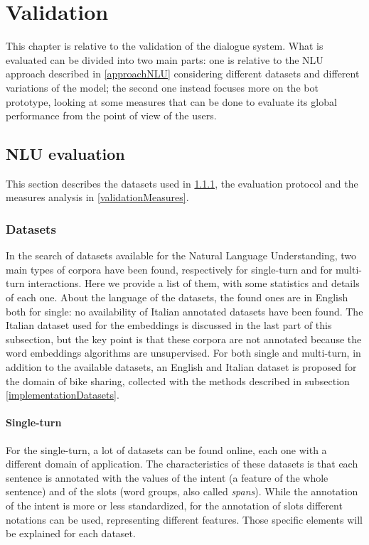 
\chapter{Validation}
\label{validation}

This chapter is relative to the validation of the dialogue system. What is evaluated can be divided into two main parts: one is relative to the NLU approach described in \ref{approachNLU} considering different datasets and different variations of the model; the second one instead focuses more on the bot prototype, looking at some measures that can be done to evaluate its global performance from the point of view of the users.

\section{NLU evaluation}
\label{validationNLU}

This section  describes the datasets used in \ref{validationDatasets}, the evaluation protocol and the measures analysis in \ref{validationMeasures}.

\subsection{Datasets}
\label{validationDatasets}

In the search of datasets available for the Natural Language Understanding, two main types of corpora have been found, respectively for single-turn and for multi-turn interactions. Here we provide a list of them, with some statistics and details of each one. About the language of the datasets, the found ones are in English both for single: no availability of Italian annotated datasets have been found. The Italian dataset used for the embeddings is discussed in the last part of this subsection, but the key point is that these corpora are not annotated because the word embeddings algorithms are unsupervised. For both single and multi-turn, in addition to the available datasets, an English and Italian dataset is proposed for the domain of bike sharing, collected with the methods described in subsection \ref{implementationDatasets}.

\subsubsection{Single-turn}
For the single-turn, a lot of datasets can be found online, each one with a different domain of application. The characteristics of these datasets is that each sentence is annotated with the values of the intent (a feature of the whole sentence) and of the slots (word groups, also called \textit{spans}). While the annotation of the intent is more or less standardized, for the annotation of slots different notations can be used, representing different features. Those specific elements will be explained for each dataset.

